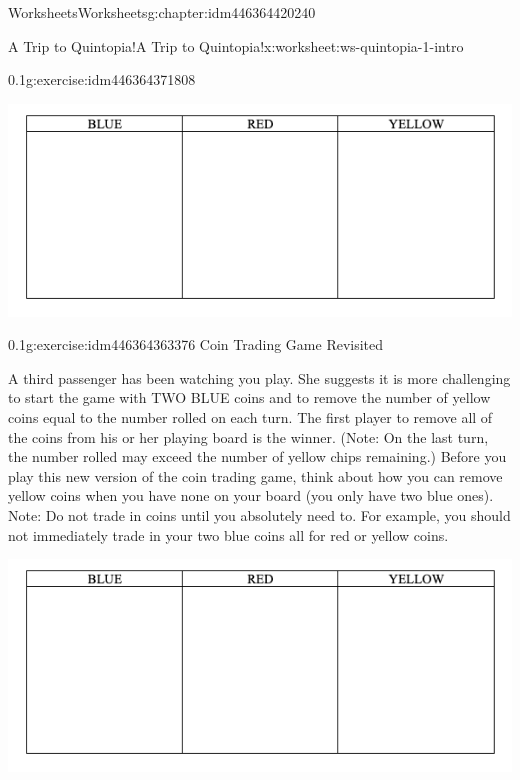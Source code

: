 \documentclass[twoside,11pt,]{book}
\begin{document}
\begin{chapterptx}{Worksheets}{}{Worksheets}{}{}{g:chapter:idm446364420240}
\begin{worksheet-section-numberless}{A Trip to Quintopia!}{}{A Trip to Quintopia!}{}{}{x:worksheet:ws-quintopia-1-intro}
\begin{divisionexercise}{1}{}{0.1}{g:exercise:idm446364371808}
\begin{sidebyside}{1}{0.05}{0.05}{0}
\begin{sbspanel}{0.9}
\includegraphics[width=1\linewidth]{images/quintopia-table.png}
\end{sbspanel}%
\end{sidebyside}%
\end{divisionexercise}%
\clearpage
\begin{divisionexercise}{2}{}{0.1}{g:exercise:idm446364363376}%
Coin Trading Game Revisited%
\par
A third passenger has been watching you play.  She suggests it is more challenging to start the game with TWO BLUE coins and to remove the number of yellow coins equal to the number rolled on each turn.  The first player to remove all of the coins from his or her playing board is the winner.  (Note: On the last turn, the number rolled may exceed the number of yellow chips remaining.)  Before you play this new version of the coin trading game, think about how you can remove yellow coins when you have none on your board (you only have two blue ones).  Note: Do not trade in coins until you absolutely need to.  For example, you should not immediately trade in your two blue coins all for red or yellow coins.%
\begin{sidebyside}{1}{0.05}{0.05}{0}%
\begin{sbspanel}{0.9}%
\includegraphics[width=1\linewidth]{images/quintopia-table.png}
\end{sbspanel}%
\end{sidebyside}%
%
\begin{description}

\end{description}
\end{divisionexercise}
\end{worksheet-section-numberless}
\end{chapterptx}
\end{document}
